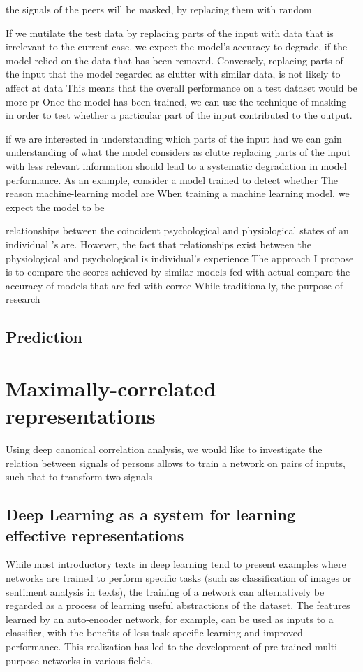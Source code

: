 \documentclass[a4paper, 11pt]{article}      %
\begin{document}
the signals of the peers will be masked, by replacing them with random 




If we mutilate the test data by replacing parts of the input with data that is irrelevant to the current case, we expect the model's accuracy to degrade, if the model relied on the data that has been removed. Conversely, replacing parts of the input that the model regarded as clutter with similar data, is not likely to affect 
at data  This means that the overall performance on a test dataset would be more pr Once the model has been trained, we can use the technique of masking in order to test whether a particular part of the input contributed to the output.

if we are interested in understanding which parts of the input had  we can gain understanding of what the model considers as clutte replacing parts of the input with less relevant information should lead to a systematic degradation in model performance. As an example, consider a model trained to detect whether 
The reason machine-learning model are 
When training a machine learning model, we expect the model to be 




relationships between the coincident psychological and physiological states of an individual
's are. However, the 
fact that relationships exist between the physiological and psychological is  
individual's experience 
The approach I propose is to compare the scores achieved by similar models fed with actual 
compare the accuracy of models that are fed with correc
While traditionally, the purpose of research 

\subsection{Prediction }

\section{Maximally-correlated representations}
Using deep canonical correlation analysis, we would like to investigate the relation between signals of persons 
allows to train a network on pairs of inputs, such that to transform two signals 
\subsection{Deep Learning as a system for learning effective representations }
While most introductory texts in deep learning tend to present examples where networks are trained to perform specific tasks (such as classification of images or sentiment analysis in texts), the training of a network can alternatively be regarded as a process of learning useful abstractions of the dataset. The features learned by an auto-encoder network, for example, can be used as inputs to a classifier, with the benefits of less task-specific learning and improved performance. This realization has led to the development of pre-trained multi-purpose networks in various fields.
\end{document}
